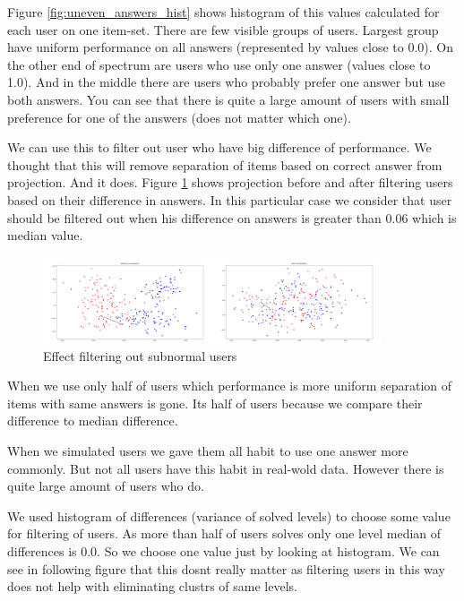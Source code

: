 \documentclass[
  digital, %
  table,   %
  nolof,     %
  nolot,     %
  nocover
]{fithesis3}
\begin{document}
Figure \ref{fig:uneven_answers_hist} shows histogram of this values calculated for each user on one item-set. There are few visible groups of users. Largest group have uniform performance on all answers (represented by values close to 0.0). On the other end of spectrum are users who use only one answer (values close to 1.0). And in the middle there are users who probably prefer one answer but use both answers. You can see that there is quite a large amount of users with small preference for one of the answers (does not matter which one).

We can use this to filter out user who have big difference of performance. We thought that this will remove separation of items based on correct answer from projection. And it does. Figure \ref{fig:answers_normalization} shows projection before and after filtering users based on their difference in answers. In this particular case we consider that user should be filtered out when his difference on answers is greater than 0.06 which is median value.

\begin{figure}
  \includegraphics[width=10cm]{img/answers_normalization}
  \caption{Effect filtering out subnormal users}
  \label{fig:answers_normalization}
\end{figure}

When we use only half of users which performance is more uniform separation of items with same answers is gone. Its half of users because we compare their difference to median difference.




When we simulated users we gave them all habit to use one answer more
commonly. But not all users have this habit in real-wold data. However
there is quite large amount of users who do.

We used histogram of differences (variance of solved levels) to choose
some value for filtering of users. As more than half of users solves
only one level median of differences is 0.0. So we choose one value just
by looking at histogram. We can see in following figure that this dosnt
really matter as filtering users in this way does not help with
eliminating clustrs of same levels.
\end{document}
